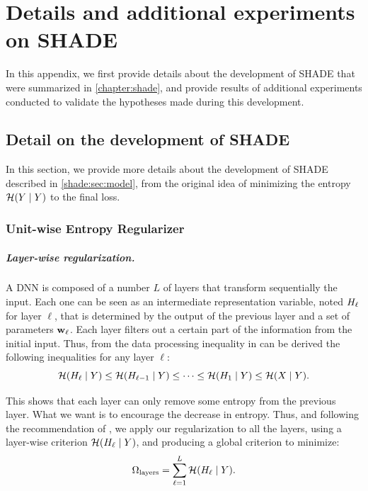 \chapter{Details and additional experiments on SHADE}
\adjustmtc
\label{chapter:shadeA}

\minitoc
{}

\vspace{2em}


In this appendix, we first provide details about the development of SHADE that were summarized in \autoref{chapter:shade}, and provide results of additional experiments conducted to validate the hypotheses made during this development.


\section{Detail on the development of SHADE}

In this section, we provide more details about the development of SHADE described in \autoref{shade:sec:model}, from the original idea of minimizing the entropy $\mathcal{H}(Y\mid Y)$ to the final loss.

\subsection{Unit-wise Entropy Regularizer}
    
\paragraph{Layer-wise regularization.} A \ac{DNN} is composed of a number $L$ of layers that transform sequentially the input. Each one can be seen as an intermediate representation variable, noted $H_\ell$ for layer $\ell$, that is determined by the output of the previous layer and a set of parameters $\mathbf{w}_\ell$. Each layer filters out a certain part of the information from the initial input. Thus, from the data processing inequality in \citet{element} can be derived the following inequalities for any layer $\ell$:
\begin{equation}
    \mathcal{H}(H_\ell \mid Y) \le \mathcal{H}(H_{\ell-1}\mid Y) \le \cdots \le  \mathcal{H}(H_{1}\mid Y) \le \mathcal{H}(X\mid Y).
\end{equation}

This shows that each layer can only remove some entropy from the previous layer. What we want is to encourage the decrease in entropy. Thus, and following the recommendation of \citet{IBdeep}, we apply our regularization to all the layers, using a layer-wise criterion $\mathcal{H}(H_\ell \mid Y)$, and producing a global criterion to minimize:
\begin{equation}
    \Omega_{\mathrm{layers}} = \sum_{\ell = 1}^L \mathcal{H}(H_\ell \mid Y).
\end{equation}

